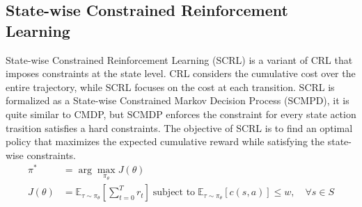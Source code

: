 \subsection{State-wise Constrained Reinforcement Learning}

State-wise Constrained Reinforcement Learning (SCRL) is a variant of CRL that imposes constraints at the state level.
CRL considers the cumulative cost over the entire trajectory, while SCRL focuses on the cost at each transition.
SCRL is formalized as a State-wise Constrained Markov Decision Process (SCMPD), it is quite similar to CMDP, but SCMDP enforces the constraint for every state action trasition satisfies a hard constraints.
The objective of SCRL is to find an optimal policy that maximizes the expected cumulative reward while satisfying the state-wise constraints.
\begin{equation}
  \begin{aligned}
    \pi^* &= \arg\max_{\pi_\theta} J(\theta) \\
    J(\theta) &= \mathbb{E}_{\tau \sim \pi_\theta} \left[ \sum^T_{t = 0} r_t \right] \; \text{subject to} \; \mathbb{E}_{\tau \sim \pi_\theta}  [c(s, a)] \leq w, \quad \forall s \in S
  \end{aligned}
\end{equation}